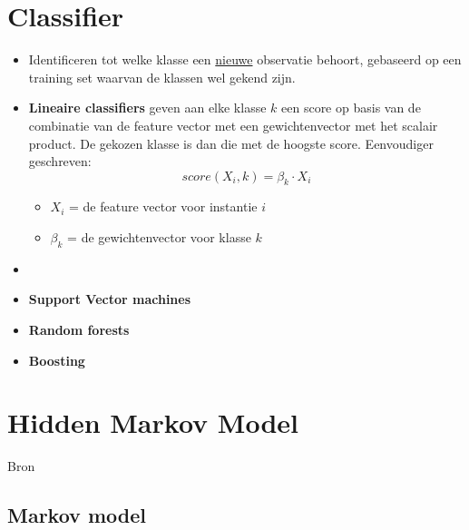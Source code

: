 \section{Classifier}
\begin{itemize}
	\item Identificeren tot welke klasse een \underline{nieuwe} observatie behoort, gebaseerd op een training set waarvan de klassen wel gekend zijn.
	\item \textbf{Lineaire classifiers} geven aan elke klasse $k$ een score op basis van de combinatie van de feature vector met een gewichtenvector met het scalair product.  De gekozen klasse is dan die met de hoogste score. Eenvoudiger geschreven:	
	$$
	score(X_i, k) = \beta_k \cdot X_i
	$$
	\begin{itemize}
		\item $X_i$ = de feature vector voor instantie $i$
		\item $\beta_k$ = de gewichtenvector voor klasse $k$
	\end{itemize}
	\item {}
	\item \textbf{Support Vector machines}
	\item \textbf{Random forests}
	\item \textbf{Boosting}
\end{itemize}




\section{Hidden Markov Model}
\label{sec:hidden_markov_model}
Bron \cite{Ramage2007}
\subsection{Markov model}

